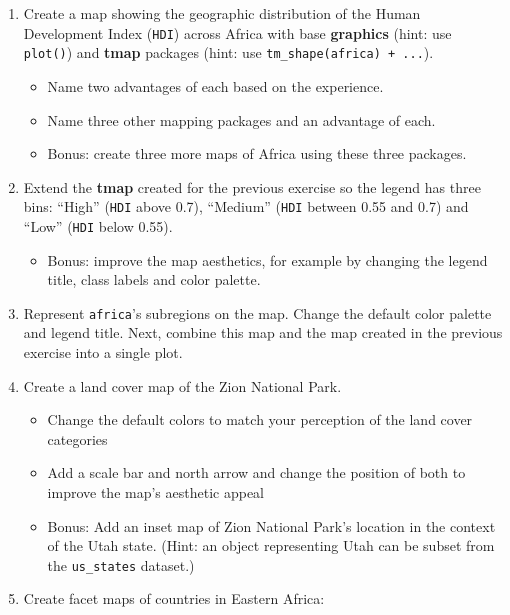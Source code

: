 \documentclass[]{krantz}
\providecommand{\tightlist}{%
  \setlength{\itemsep}{0pt}\setlength{\parskip}{0pt}}
\begin{document}
\begin{enumerate}
\def\labelenumi{\arabic{enumi}.}
\tightlist
\item
  Create a map showing the geographic distribution of the Human Development Index (\texttt{HDI}) across Africa with base \textbf{graphics} (hint: use \texttt{plot()}) and \textbf{tmap} packages (hint: use \texttt{tm\_shape(africa)\ +\ ...}).

  \begin{itemize}
  \tightlist
  \item
    Name two advantages of each based on the experience.
  \item
    Name three other mapping packages and an advantage of each.
  \item
    Bonus: create three more maps of Africa using these three packages.
  \end{itemize}
\item
  Extend the \textbf{tmap} created for the previous exercise so the legend has three bins: ``High'' (\texttt{HDI} above 0.7), ``Medium'' (\texttt{HDI} between 0.55 and 0.7) and ``Low'' (\texttt{HDI} below 0.55).

  \begin{itemize}
  \tightlist
  \item
    Bonus: improve the map aesthetics, for example by changing the legend title, class labels and color palette.
  \end{itemize}
\item
  Represent \texttt{africa}'s subregions on the map.
  Change the default color palette and legend title.
  Next, combine this map and the map created in the previous exercise into a single plot.
\item
  Create a land cover map of the Zion National Park.

  \begin{itemize}
  \tightlist
  \item
    Change the default colors to match your perception of the land cover categories
  \item
    Add a scale bar and north arrow and change the position of both to improve the map's aesthetic appeal
  \item
    Bonus: Add an inset map of Zion National Park's location in the context of the Utah state. (Hint: an object representing Utah can be subset from the \texttt{us\_states} dataset.)
  \end{itemize}
\item
  Create facet maps of countries in Eastern Africa:


\end{enumerate}
\end{document}
